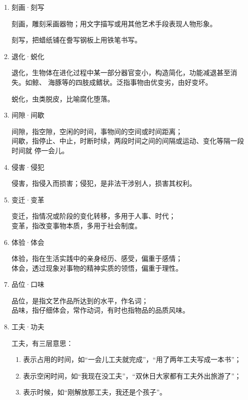 \documentclass[final,oneside]{ctexbook}
\begin{document}
\begin{enumerate}
    反应，指事情所引起的意见、态度或行动；\\
    反映，指向上汇报或通过文艺作品表现客观事物的实质。

  \item 刻画·刻写

    刻画，雕刻采画器物；用文字描写或用其他艺术手段表现人物形象。

    刻写，把蜡纸铺在誊写钢板上用铁笔书写。

  \item 退化·蜕化

    退化，生物体在进化过程中某一部分器官变小，构造简化，功能减退甚至消失。如鲸、
    海豚等的四肢成鳍状。泛指事物由优变劣，由好变坏。

    蜕化，虫类脱皮，比喻腐化堕落。

  \item 间隙·间歇

    间隙，指空隙，空闲的时间，事物间的空间或时间距离；\\
    间歇，指停止、中止，时断时续，两段时间之间的间隔或运动、变化等隔一段时间就
    停一会儿。

  \item 侵害·侵犯

    侵害，指侵入而损害；侵犯，是非法干涉别人，损害其权利。

  \item 变迁·变革

    变迁，指情况或阶段的变化转移，多用于人事、时代；\\
    变革，指改变事物本质，多用于社会制度。

  \item 体验·体会

    体验，指在生活实践中的亲身经历、感受，偏重于感情；\\
    体会，透过现象对事物的精神实质的领悟，偏重于理性。

  \item 品位·口味

    品位，是指文艺作品所达到的水平，作名词；\\
    品味，指仔细体会，常作动词，有时也指物品的品质风味。

  \item 工夫·功夫

    工夫，有三层意思：
    \begin{enumerate}
      \item 表示占用的时间，如“一会儿工夫就完成”，“用了两年工夫写成一本书”；
      \item 表示空闲时间，如“我现在没工夫”，“双休日大家都有工夫外出旅游了”；
      \item 表示时候，如“刚解放那工夫，我还是个孩子”。
    \end{enumerate}


\end{enumerate}
\end{document}
